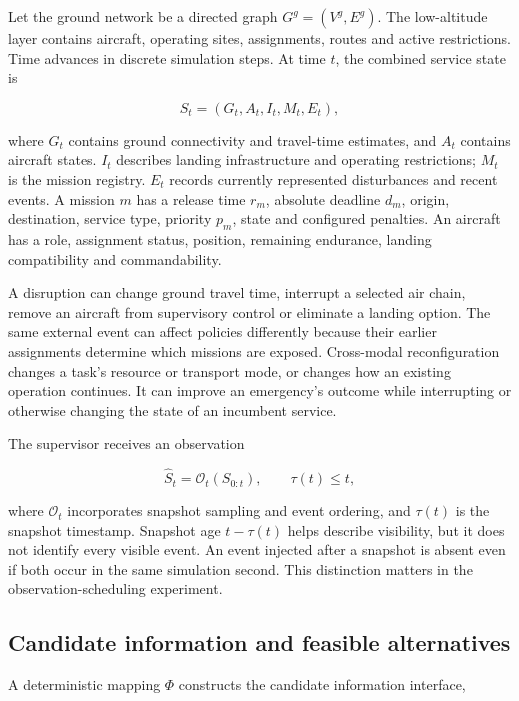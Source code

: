 \documentclass[]{interact}
\theoremstyle{plain}
\theoremstyle{definition}
\theoremstyle{remark}
\begin{document}
Let the ground network be a directed graph $G^g=(V^g,E^g)$. The low-altitude layer contains aircraft, operating sites, assignments, routes and active restrictions. Time advances in discrete simulation steps. At time $t$, the combined service state is

\begin{equation*}
S_t=(G_t,A_t,I_t,M_t,E_t), \tag{1}
\end{equation*}

where $G_t$ contains ground connectivity and travel-time estimates, and $A_t$ contains aircraft states. $I_t$ describes landing infrastructure and operating restrictions; $M_t$ is the mission registry. $E_t$ records currently represented disturbances and recent events. A mission $m$ has a release time $r_m$, absolute deadline $d_m$, origin, destination, service type, priority $p_m$, state and configured penalties. An aircraft has a role, assignment status, position, remaining endurance, landing compatibility and commandability.

A disruption can change ground travel time, interrupt a selected air chain, remove an aircraft from supervisory control or eliminate a landing option. The same external event can affect policies differently because their earlier assignments determine which missions are exposed. Cross-modal reconfiguration changes a task's resource or transport mode, or changes how an existing operation continues. It can improve an emergency's outcome while interrupting or otherwise changing the state of an incumbent service.

The supervisor receives an observation

\begin{equation*}
\widehat S_t=\mathcal O_t(S_{0:t}),\qquad \tau(t)\le t, \tag{2}
\end{equation*}

where $\mathcal O_t$ incorporates snapshot sampling and event ordering, and $\tau(t)$ is the snapshot timestamp. Snapshot age $t-\tau(t)$ helps describe visibility, but it does not identify every visible event. An event injected after a snapshot is absent even if both occur in the same simulation second. This distinction matters in the observation-scheduling experiment.

\subsection{Candidate information and feasible alternatives}

A deterministic mapping $\Phi$ constructs the candidate information interface,
\end{document}
